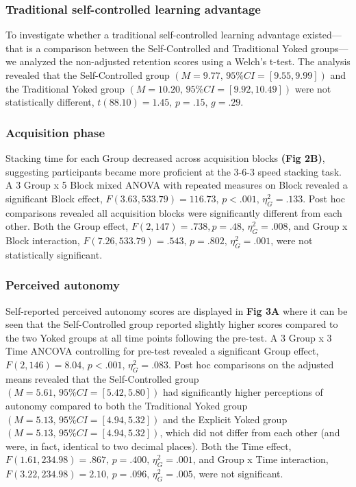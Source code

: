 \documentclass[
  english,
  jou]{apa7}
\begin{document}
\hypertarget{traditional-self-controlled-learning-advantage}{%
\subsubsection{Traditional self-controlled learning advantage}\label{traditional-self-controlled-learning-advantage}}

To investigate whether a traditional self-controlled learning advantage existed---that is a comparison between the Self-Controlled and Traditional Yoked groups---we analyzed the non-adjusted retention scores using a Welch's t-test. The analysis revealed that the Self-Controlled group \((M = 9.77, \,95\%CI = [9.55,9.99])\) and the Traditional Yoked group \((M = 10.20, \,95\%CI = [9.92,10.49])\) were not statistically different, \(t(88.10) = 1.45, \,p = .15, \,g = .29\).

\hypertarget{acquisition-phase}{%
\subsubsection{Acquisition phase}\label{acquisition-phase}}

Stacking time for each Group decreased across acquisition blocks \textbf{(Fig 2B)}, suggesting participants became more proficient at the 3-6-3 speed stacking task. A 3 Group x 5 Block mixed ANOVA with repeated measures on Block revealed a significant Block effect, \(F(3.63,533.79) = 116.73, \,p < .001, \,\eta^2_{G} = .133\). Post hoc comparisons revealed all acquisition blocks were significantly different from each other. Both the Group effect, \(F(2,147) = .738, p = .48, \,\eta^2_{G} = .008\), and Group x Block interaction, \(F(7.26,533.79) = .543, \,p = .802, \,\eta^2_{G} = .001\), were not statistically significant.

\hypertarget{perceived-autonomy}{%
\subsubsection{Perceived autonomy}\label{perceived-autonomy}}

Self-reported perceived autonomy scores are displayed in \textbf{Fig 3A} where it can be seen that the Self-Controlled group reported slightly higher scores compared to the two Yoked groups at all time points following the pre-test. A 3 Group x 3 Time ANCOVA controlling for pre-test revealed a significant Group effect, \(F(2,146) = 8.04, \,p < .001, \,\eta^2_{G} = .083.\) Post hoc comparisons on the adjusted means revealed that the Self-Controlled group \((M = 5.61, \,95\%CI =[5.42,5.80])\) had significantly higher perceptions of autonomy compared to both the Traditional Yoked group \((M = 5.13, \,95\%CI = [4.94,5.32])\) and the Explicit Yoked group \((M = 5.13, \,95\%CI = [4.94,5.32])\), which did not differ from each other (and were, in fact, identical to two decimal places). Both the Time effect, \(F(1.61,234.98) = .867, \,p = .400, \,\eta^2_{G} = .001\), and Group x Time interaction, \(F(3.22,234.98) = 2.10, \,p = .096, \,\eta^2_{G} = .005\), were not significant.
\end{document}
